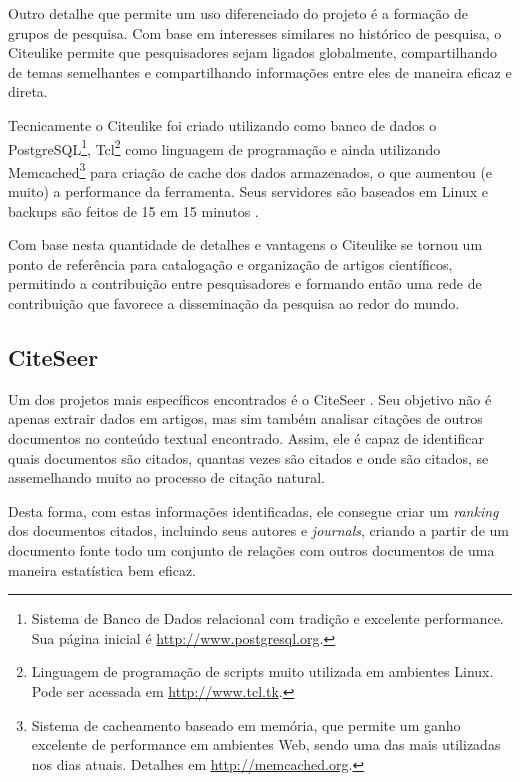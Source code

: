 \begin{textnew}
Outro detalhe que permite um uso diferenciado do projeto é a formação de grupos de pesquisa. Com base em interesses similares no histórico de pesquisa, o Citeulike permite que pesquisadores sejam ligados globalmente, compartilhando de temas semelhantes e compartilhando informações entre eles de maneira eficaz e direta.

Tecnicamente o Citeulike foi criado utilizando como banco de dados o PostgreSQL\footnote{Sistema de Banco de Dados relacional com tradição e excelente performance. Sua página inicial é \url{http://www.postgresql.org}.}, Tcl\footnote{Linguagem de programação de scripts muito utilizada em ambientes Linux. Pode ser acessada em \url{http://www.tcl.tk}.} como linguagem de programação e ainda utilizando Memcached\footnote{Sistema de cacheamento baseado em memória, que permite um ganho excelente de performance em ambientes Web, sendo uma das mais utilizadas nos dias atuais. Detalhes em \url{http://memcached.org}.} para criação de cache dos dados armazenados, o que aumentou (e muito) a performance da ferramenta. Seus servidores são baseados em Linux e backups são feitos de 15 em 15 minutos \cite{citeulike}.

Com base nesta quantidade de detalhes e vantagens o Citeulike se tornou um ponto de referência para catalogação e organização de artigos científicos, permitindo a contribuição entre pesquisadores e formando então uma rede de contribuição que favorece a disseminação da pesquisa ao redor do mundo.

\end{textnew}


\subsection{CiteSeer}
\label{ssec:citeseer}

Um dos projetos mais específicos encontrados é o CiteSeer \cite{citeseer}. Seu objetivo não é apenas extrair dados em artigos, mas sim também analisar citações de outros documentos no conteúdo textual encontrado. Assim, ele é capaz de identificar quais documentos são citados, quantas vezes são citados e onde são citados, se assemelhando muito ao processo de citação natural.

Desta forma, com estas informações identificadas, ele consegue criar um \textit{ranking} dos documentos citados, incluindo seus autores e \textit{journals}, criando a partir de um documento fonte todo um conjunto de relações com outros documentos de uma maneira estatística bem eficaz.

